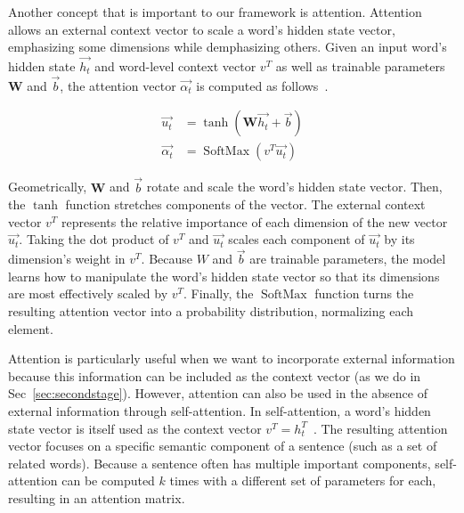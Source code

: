 Another concept that is important to our framework is attention. Attention allows an external context vector to scale a word's hidden state vector, emphasizing some dimensions while demphasizing others. 
Given an input word's hidden state $\vec{h_t}$ and word-level context vector $v^{T}$ as well as trainable parameters $\mathbf{W}$ and $\vec{b}$, the attention vector $\vec{\alpha_t}$ is computed as follows~\citep{understandingattention}.

{
    {
        \begin{align*} 
            \vec{u_t} &= \tanh (\mathbf{W} \vec{h_t} + \vec{b}) \\
            \vec{\alpha_t}  &= \operatorname{SoftMax}(v^{T} \vec{u_t})
        \end{align*} 
    } %
}

Geometrically, $\mathbf{W}$ and $\vec{b}$ rotate and scale the  word's hidden state vector. Then, the $\tanh$ function stretches components of the vector. The external context vector $v^{T}$ represents the relative importance of each dimension of the new vector $\vec{u_t}$. Taking the dot product of $v^{T}$ and $\vec{u_t}$ scales each component of $\vec{u_t}$ by its dimension's weight in $v^{T}$. Because $W$ and $\vec{b}$ are trainable parameters, the model learns how to manipulate the word's hidden state vector so that its dimensions are most effectively scaled by $v^{T}$. Finally, the $\operatorname{SoftMax}$ function turns the resulting attention vector into a probability distribution, normalizing each element.

Attention is particularly useful when we want to incorporate external information because this information can be included as the context vector (as we do in Sec~\ref{sec:secondstage}). However, attention can also be used in the absence of external information through self-attention. In self-attention, a word's hidden state vector is itself used as the context vector $v^{T} = h_t^{T}$~\citep{selfattentive}. The resulting attention vector focuses on a specific semantic component of a sentence (such as a set of related words). Because a sentence often has multiple important components, self-attention can be computed $k$ times with a different set of parameters for each, resulting in an attention matrix. %


